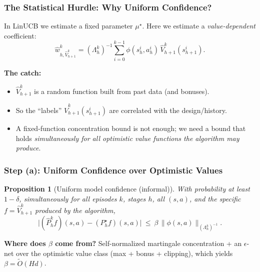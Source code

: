 \documentclass[aspectratio=169]{beamer}
\newtheorem{proposition}[theorem]{Proposition}
\begin{document}
\begin{frame}\frametitle{The Statistical Hurdle: Why Uniform Confidence?}

\small
In LinUCB we estimate a fixed parameter $\mu^\star$. Here we estimate a \emph{value-dependent} coefficient:
\[
\widehat w_{h,\widehat V_{h+1}^k}^k
=
(\Lambda_h^k)^{-1}\sum_{i=0}^{k-1}\phi(s_h^i,a_h^i)\,\widehat V_{h+1}^k(s_{h+1}^i).
\]

\vspace{0.12cm}
\pause
\textbf{The catch:}
\begin{itemize}
  \item $\widehat V_{h+1}^k$ is a \alert{random function} built from past data (and bonuses).
  \item So the ``labels'' $\widehat V_{h+1}^k(s_{h+1}^i)$ are correlated with the design/history.
  \item A fixed-function concentration bound is not enough; we need a bound that holds
  \emph{simultaneously for all optimistic value functions the algorithm may produce}.
\end{itemize}

\end{frame}


\begin{frame}\frametitle{Step (a): Uniform Confidence over Optimistic Values}

\small
\begin{proposition}[Uniform model confidence (informal)]
With probability at least $1-\delta$, simultaneously for all episodes $k$, stages $h$,
all $(s,a)$, and the specific $f=\widehat V_{h+1}^k$ produced by the algorithm,
\[
\big|(\widehat P_h^k f)(s,a) - (P_h^\star f)(s,a)\big|
\ \le\ 
\beta\,\|\phi(s,a)\|_{(\Lambda_h^k)^{-1}}.
\]
\end{proposition}

\vspace{0.10cm}
\pause
\textbf{Where does $\beta$ come from?}
Self-normalized martingale concentration + an $\epsilon$-net over the optimistic value class
(max + bonus + clipping), which yields $\beta=\widetilde O(Hd)$.

\end{frame}
\end{document}
